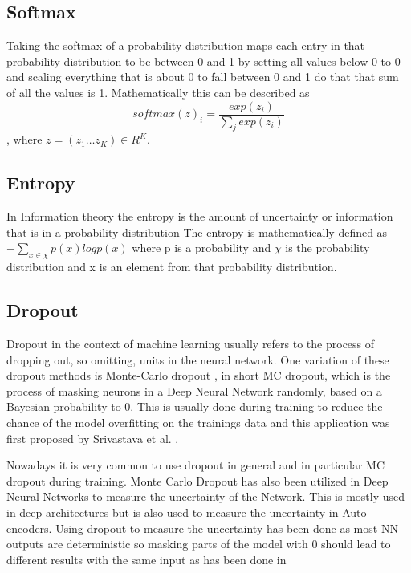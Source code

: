 \subsection{Softmax}
Taking the softmax of a probability distribution maps each entry in that probability distribution to be between 0 and 1 by setting all values below 0 to 0 and scaling everything that is about 0 to fall between 0 and 1 do that that sum of all the values is 1. 
Mathematically this can be described as $$softmax(z)_i=\frac{exp(z_i)}{\sum_j exp(z_i)}$$, where $z=(z_1\dots z_K)\in R^K$.

\subsection{Entropy}
\label{entropy}
In Information theory the entropy is the amount of uncertainty or information that is in a probability distribution
The entropy is mathematically defined as $- \sum_{x\in \chi} p(x) log p(x)$ where p is a probability and $\chi$ is the probability distribution and x is an element from that probability distribution.


\subsection{Dropout}
Dropout in the context of machine learning usually refers to the process of dropping out, so omitting, units in the neural network. 
One variation of these dropout methods is Monte-Carlo dropout \cite{gal2016dropoutbayesianapproximationrepresenting}, in short MC dropout, which is the process of masking neurons in a Deep Neural Network randomly, based on a Bayesian probability to 0. 
This is usually done during training to reduce the chance of the model overfitting on the trainings data and this application was first proposed by Srivastava et al. \cite{JMLR:v15:srivastava14a}. 

Nowadays it is very common to use dropout in general and in particular MC dropout during training.
Monte Carlo Dropout has also been utilized in Deep Neural Networks to measure the uncertainty of the Network.   
This is mostly used in deep architectures but is also used to measure the uncertainty in Auto-encoders. \cite{gawlikowski2022surveyuncertaintydeepneural}
Using dropout to measure the uncertainty has been done as most NN outputs are deterministic so masking parts of the model with 0 should lead to different results with the same input as has been done in \cite{gal2016dropoutbayesianapproximationrepresenting}

